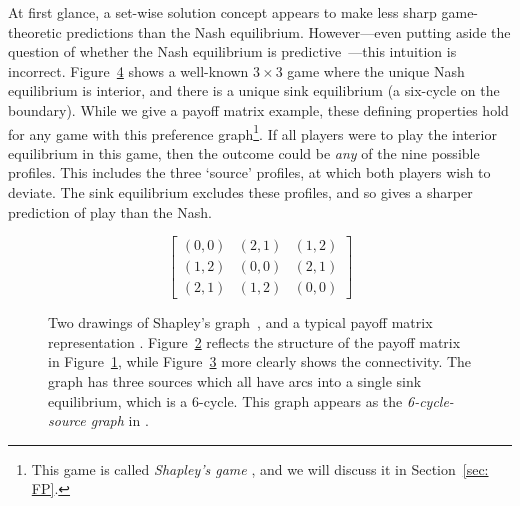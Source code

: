 \documentclass[preprint,authoryear]{elsarticle}
\begin{document}
At first glance, a set-wise solution concept appears to make less sharp game-theoretic predictions than the Nash equilibrium. However---even putting aside the question of whether the Nash equilibrium is predictive~\citep{milgrom_adaptive_1991,gaunersdorfer_fictitious_1995,hofbauer2011survival,galla_complex_2013}---this intuition is incorrect. Figure~\ref{fig:shapley} shows a well-known $3\times 3$ game where the unique Nash equilibrium is interior, and there is a unique sink equilibrium (a six-cycle on the boundary). While we give a payoff matrix example, these defining properties hold for any game with this preference graph\footnote{This game is called \emph{Shapley's game} \citep{shapley_topics_1964}, and we will discuss it in Section~\ref{sec: FP}.}. If all players were to play the interior equilibrium in this game, then the outcome could be \emph{any} of the nine possible profiles. This includes the three `source' profiles, at which both players wish to deviate. The sink equilibrium excludes these profiles, and so gives a sharper prediction of play than the Nash.

\begin{figure}
    \centering
    \begin{subfigure}{.3\textwidth}
        \centering
        \begin{equation*}
            \begin{bmatrix}
                (0,0) & (2,1) & (1,2) \\
                (1,2) & (0,0) & (2,1) \\
                (2,1) & (1,2) & (0,0)
            \end{bmatrix}
        \end{equation*}
        \caption{}
        \label{fig:shapley payoff}
    \end{subfigure}
    \begin{subfigure}{.3\textwidth}
        \centering
        
        \caption{}
        \label{fig:shapley-square}
    \end{subfigure}
    \begin{subfigure}{.3\textwidth}
        \centering
        
        \caption{}
        \label{fig:shapley-cycle}
    \end{subfigure}
    \caption{Two drawings of Shapley's graph~\citep{shapley_topics_1964}, and a typical payoff matrix representation \citep[\textit{e.g.},][]{krishna_convergence_1998}. Figure~\ref{fig:shapley-square} reflects the structure of the payoff matrix in Figure~\ref{fig:shapley payoff}, while Figure~\ref{fig:shapley-cycle} more clearly shows the connectivity. The graph has three sources which all have arcs into a single sink equilibrium, which is a 6-cycle. This graph appears as the \emph{6-cycle-source graph} in \cite{biggar_graph_2023}.}
    \label{fig:shapley}
\end{figure}
\end{document}
